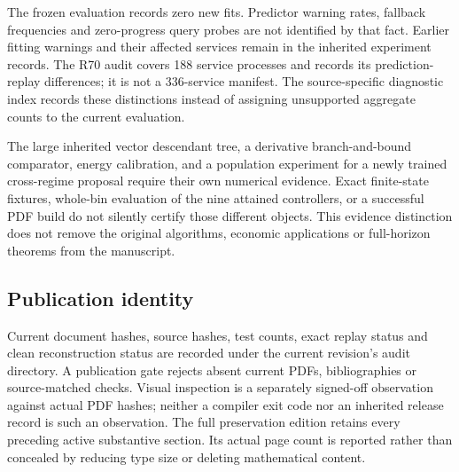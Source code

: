 The frozen evaluation records zero new fits. Predictor warning rates, fallback frequencies and zero-progress query probes are not identified by that fact. Earlier fitting warnings and their affected services remain in the inherited experiment records. The R70 audit covers 188 service processes and records its prediction-replay differences; it is not a 336-service manifest. The source-specific diagnostic index records these distinctions instead of assigning unsupported aggregate counts to the current evaluation.

The large inherited vector descendant tree, a derivative branch-and-bound comparator, energy calibration, and a population experiment for a newly trained cross-regime proposal require their own numerical evidence. Exact finite-state fixtures, whole-bin evaluation of the nine attained controllers, or a successful PDF build do not silently certify those different objects. This evidence distinction does not remove the original algorithms, economic applications or full-horizon theorems from the manuscript.

\subsection{Publication identity}
Current document hashes, source hashes, test counts, exact replay status and clean reconstruction status are recorded under the current revision's audit directory. A publication gate rejects absent current PDFs, bibliographies or source-matched checks. Visual inspection is a separately signed-off observation against actual PDF hashes; neither a compiler exit code nor an inherited release record is such an observation. The full preservation edition retains every preceding active substantive section. Its actual page count is reported rather than concealed by reducing type size or deleting mathematical content.
